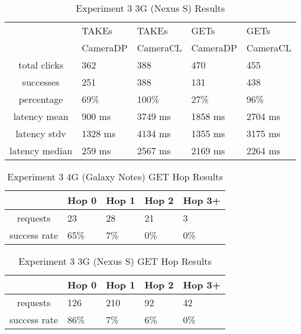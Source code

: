 \begin{table}[htb]
\begin{scriptsize} 
\caption{Experiment 3 3G (Nexus S) Results} 
\label{table:exp-3-3g-results}
 \begin{center}
 \begin{tabular}{| c | p{1.5cm} | p{1.5cm} | p{1.5cm} | p{1.4cm} |}
  \hline
  & TAKEs & TAKEs & GETs & GETs \\
  & CameraDP & CameraCL & CameraDP & CameraCL \\
  \hline
  total clicks & 362 & 388 & 470 & 455 \\
  \hline
  successes & 251 & 388 & 131 & 438 \\
  \hline
  percentage & 69\% & 100\% & 27\% & 96\% \\
  \hline
  latency mean & 900 ms & 3749 ms & 1858 ms & 2704 ms \\
  \hline
  latency stdv & 1328 ms & 4134 ms &1355 ms & 3175 ms \\
  \hline
  latency median & 259 ms & 2567 ms & 2169 ms & 2264 ms \\
  \hline
  \end{tabular}
  \end{center}
\end{scriptsize}
\end{table}


\begin{table}[htb]
\begin{scriptsize} 
\caption{Experiment 3 4G (Galaxy Notes) GET Hop Results} 
\label{table:exp-3-4g-hop-results}
 \begin{center}
 \begin{tabular}{| c | p{1.5cm} | p{1.5cm} | p{1.5cm} | p{1.4cm} |}
  \hline
   & Hop 0 & Hop 1 & Hop 2 & Hop 3+ \\
  \hline
  requests & 23 & 28 & 21 & 3\\
  \hline
  success rate & 65\% & 7\% & 0\% & 0\% \\
  \hline
  \end{tabular}
  \end{center}
\end{scriptsize}
\end{table}

\begin{table}[htb]
\begin{scriptsize} 
\caption{Experiment 3 3G (Nexus S) GET Hop Results} 
\label{table:exp-3-3g-hop-results}
 \begin{center}
 \begin{tabular}{| c | p{1.5cm} | p{1.5cm} | p{1.5cm} | p{1.4cm} |}
  \hline
   & Hop 0 & Hop 1 & Hop 2 & Hop 3+ \\
  \hline
  requests & 126 & 210 & 92 & 42\\
  \hline
  success rate & 86\% & 7\% & 6\% & 0\% \\
  \hline
  \end{tabular}
  \end{center}
\end{scriptsize}
\end{table}

